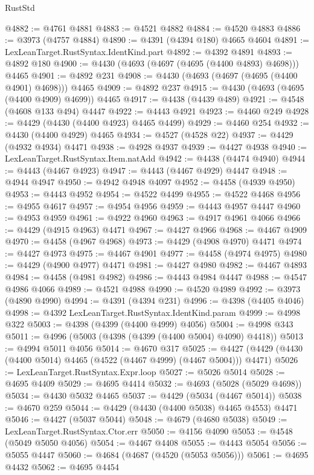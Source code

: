 \begin{lexlean}{RustStd}
\begin{coremodule}
@4882 := @4761 @4881
@4883 := @4521 @4882
@4884 := @4520 @4883
@4886 := @3973 (@4757 @4884)
@4890 := @4391 (@4394 @180) @4665 @4604
@4891 := LexLeanTarget.RustSyntax.IdentKind.part
@4892 := @4392 @4891
@4893 := @4892 @180
@4900 := @4430 (@4693 (@4697 (@4695 (@4400 @4893) @4698))) @4465
@4901 := @4892 @231
@4908 := @4430 (@4693 (@4697 (@4695 (@4400 @4901) @4698))) @4465
@4909 := @4892 @237
@4915 := @4430 (@4693 (@4695 (@4400 @4909) @4699)) @4465
@4917 := @4438 (@4439 @489)
@4921 := @4548 (@4608 @133 @494) @4447
@4922 := @4443 @4921
@4923 := @4460 @249
@4928 := @4429 (@4430 (@4400 @4923) @4465 @4499)
@4929 := @4460 @254
@4932 := @4430 (@4400 @4929) @4465
@4934 := @4527 (@4528 @22)
@4937 := @4429 (@4932 @4934) @4471
@4938 := @4928 @4937
@4939 := @4427 @4938
@4940 := LexLeanTarget.RustSyntax.Item.natAdd
@4942 := @4438 (@4474 @4940)
@4944 := @4443 (@4467 @4923)
@4947 := @4443 (@4467 @4929) @4447
@4948 := @4944 @4947
@4950 := @4942 @4948 @4097
@4952 := @4458 (@4939 @4950)
@4953 := @4443 @4952
@4954 := @4522 @4499
@4955 := @4522 @4468
@4956 := @4955 @4617
@4957 := @4954 @4956
@4959 := @4443 @4957 @4447
@4960 := @4953 @4959
@4961 := @4922 @4960
@4963 := @4917 @4961 @4066
@4966 := @4429 (@4915 @4963) @4471
@4967 := @4427 @4966
@4968 := @4467 @4909
@4970 := @4458 (@4967 @4968)
@4973 := @4429 (@4908 @4970) @4471
@4974 := @4427 @4973
@4975 := @4467 @4901
@4977 := @4458 (@4974 @4975)
@4980 := @4429 (@4900 @4977) @4471
@4981 := @4427 @4980
@4982 := @4467 @4893
@4984 := @4458 (@4981 @4982)
@4986 := @4443 @4984 @4447
@4988 := @4547 @4986 @4066
@4989 := @4521 @4988
@4990 := @4520 @4989
@4992 := @3973 (@4890 @4990)
@4994 := @4391 (@4394 @231)
@4996 := @4398 (@4405 @4046)
@4998 := @4392 LexLeanTarget.RustSyntax.IdentKind.param
@4999 := @4998 @322
@5003 := @4398 (@4399 (@4400 @4999) @4056)
@5004 := @4998 @343
@5011 := @4996 (@5003 (@4398 (@4399 (@4400 @5004) @4090) @4418))
@5013 := @4994 @5011 @4056
@5014 := @4670 @317
@5025 := @4427 (@4429 (@4430 (@4400 @5014) @4465 (@4522 (@4467 @4999) (@4467 @5004))) @4471)
@5026 := LexLeanTarget.RustSyntax.Expr.loop
@5027 := @5026 @5014
@5028 := @4695 @4409
@5029 := @4695 @4414
@5032 := @4693 (@5028 (@5029 @4698))
@5034 := @4430 @5032 @4465
@5037 := @4429 (@5034 (@4467 @5014))
@5038 := @4670 @259
@5044 := @4429 (@4430 (@4400 @5038) @4465 @4553) @4471
@5046 := @4427 (@5037 @5044)
@5048 := @4679 (@4680 @5038)
@5049 := LexLeanTarget.RustSyntax.Ctor.err
@5050 := @4156 @4090
@5053 := @4548 (@5049 @5050 @4056)
@5054 := @4467 @4408
@5055 := @4443 @5054
@5056 := @5055 @4447
@5060 := @4684 (@4687 (@4520 (@5053 @5056)))
@5061 := @4695 @4432
@5062 := @4695 @4454

\end{coremodule}
\end{lexlean}

